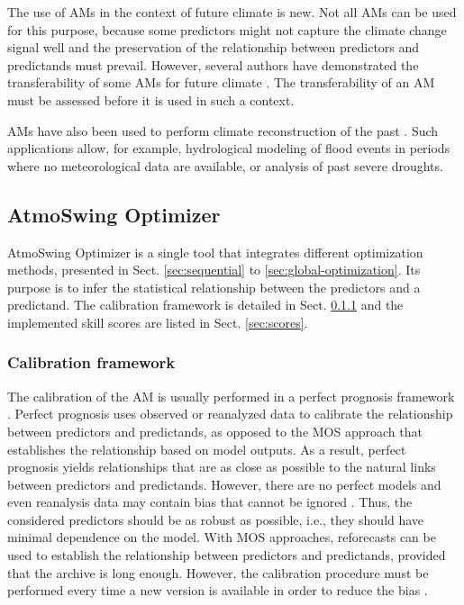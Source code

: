 \documentclass[gmd]{copernicus}
\begin{document}
The use of AMs in the context of future climate is new. Not all AMs can be used for this purpose, because some predictors might not capture the climate change signal well and the preservation of the relationship between predictors and predictands must prevail. However, several authors have demonstrated the transferability of some AMs for future climate \citep{Dayon2015, Dayon2018, Raynaud2016, Turco2017}. The transferability of an AM must be assessed before it is used in such a context. 

AMs have also been used to perform climate reconstruction of the past \citep{Caillouet2016, Caillouet2017, Bonnet2017}. Such applications allow, for example, hydrological modeling of flood events in periods where no meteorological data are available, or analysis of past severe droughts. 


\subsection{AtmoSwing Optimizer}
\label{sec:optimizer}

AtmoSwing Optimizer is a single tool that integrates different optimization methods, presented in Sect. \ref{sec:sequential} to \ref{sec:global-optimization}. Its purpose is to infer the statistical relationship between the predictors and a predictand. The calibration framework is detailed in Sect. \ref{sec:calibration-framework} and the implemented skill scores are listed in Sect. \ref{sec:scores}.


\subsubsection{Calibration framework}
\label{sec:calibration-framework}

The calibration of the AM is usually performed in a perfect prognosis \citep{Klein1959} framework \citep{Bontron2004, BenDaoud2010}. Perfect prognosis uses observed or reanalyzed data to calibrate the relationship between predictors and predictands, as opposed to the MOS approach that establishes the relationship based on model outputs. As a result, perfect prognosis yields relationships that are as close as possible to the natural links between predictors and predictands. However, there are no perfect models and even reanalysis data may contain bias that cannot be ignored \citep{Dayon2015, Horton2018b}. Thus, the considered predictors should be as robust as possible, i.e., they should have minimal dependence on the model. With MOS approaches, reforecasts can be used to establish the relationship between predictors and predictands, provided that the archive is long enough. However, the calibration procedure must be performed every time a new version is available in order to reduce the bias \citep{Wilson2002}.
\end{document}
